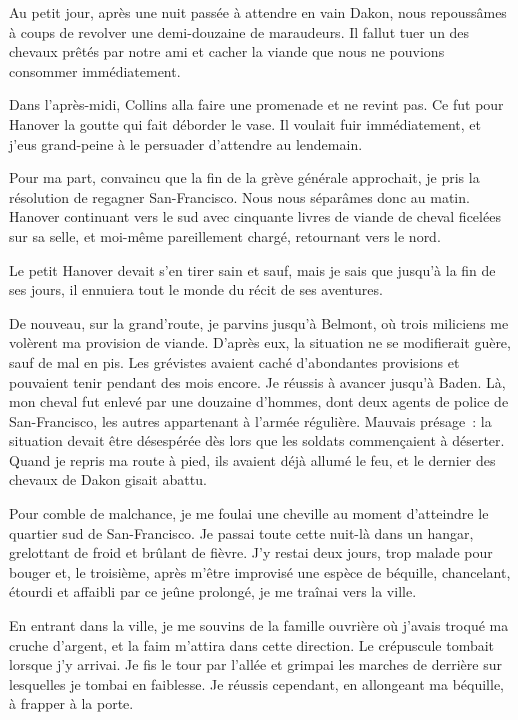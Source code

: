 \documentclass[french,twoside]{book} %
\begin{document}
Au petit jour, après une nuit passée à attendre en vain Dakon, nous repoussâmes à coups de revolver une demi-douzaine de maraudeurs. Il fallut tuer un des chevaux prêtés par notre ami et cacher la viande que nous ne pouvions consommer immédiatement.\par
Dans l’après-midi, Collins alla faire une promenade et ne revint pas. Ce fut pour Hanover la goutte qui fait déborder le vase. Il voulait fuir immédiatement, et j’eus grand-peine à le persuader d’attendre au lendemain.\par
Pour ma part, convaincu que la fin de la grève générale approchait, je pris la résolution de regagner San-Francisco. Nous nous séparâmes donc au matin. Hanover continuant vers le sud avec cinquante livres de viande de cheval ficelées sur sa selle, et moi-même pareillement chargé, retournant vers le nord.\par
Le petit Hanover devait s’en tirer sain et sauf, mais je sais que jusqu’à la fin de ses jours, il ennuiera tout le monde du récit de ses aventures.\par
De nouveau, sur la grand’route, je parvins jusqu’à Belmont, où trois miliciens me volèrent ma provision de viande. D’après eux, la situation ne se modifierait guère, sauf de mal en pis. Les grévistes avaient caché d’abondantes provisions et pouvaient tenir pendant des mois encore. Je réussis à avancer jusqu’à Baden. Là, mon cheval fut enlevé par une douzaine d’hommes, dont deux agents de police de San-Francisco, les autres appartenant à l’armée régulière. Mauvais présage : la situation devait être désespérée dès lors que les soldats commençaient à déserter. Quand je repris ma route à pied, ils avaient déjà allumé le feu, et le dernier des chevaux de Dakon gisait abattu.\par
Pour comble de malchance, je me foulai une cheville au moment d’atteindre le quartier sud de San-Francisco. Je passai toute cette nuit-là dans un hangar, grelottant de froid et brûlant de fièvre. J’y restai deux jours, trop malade pour bouger et, le troisième, après m’être improvisé une espèce de béquille, chancelant, étourdi et affaibli par ce jeûne prolongé, je me traînai vers la ville.\par
En entrant dans la ville, je me souvins de la famille ouvrière où j’avais troqué ma cruche d’argent, et la faim m’attira dans cette direction. Le crépuscule tombait lorsque j’y arrivai. Je fis le tour par l’allée et grimpai les marches de derrière sur lesquelles je tombai en faiblesse. Je réussis cependant, en allongeant ma béquille, à frapper à la porte.\par
\end{document}
